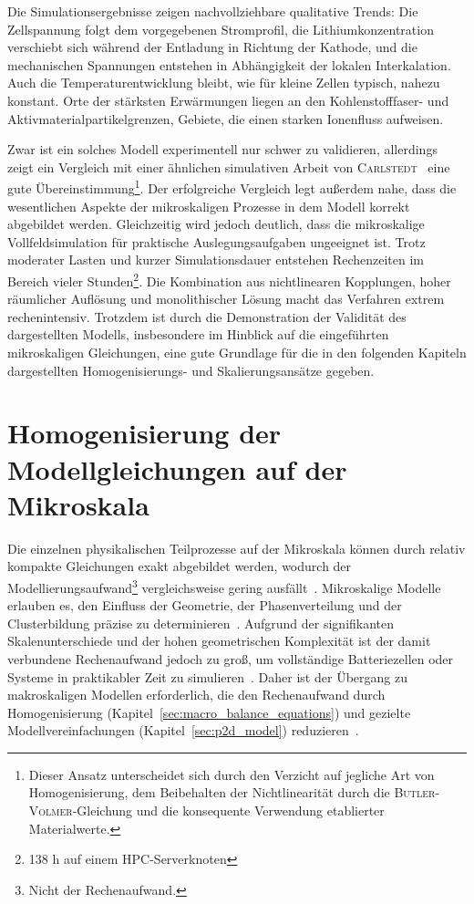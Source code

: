 Die Simulationsergebnisse zeigen nachvollziehbare qualitative Trends: Die Zellspannung folgt dem vorgegebenen Stromprofil, die Lithiumkonzentration verschiebt sich während der Entladung in Richtung der Kathode, und die mechanischen Spannungen entstehen in Abhängigkeit der lokalen Interkalation. Auch die Temperaturentwicklung bleibt, wie für kleine Zellen typisch, nahezu konstant. Orte der stärksten Erwärmungen liegen an den Kohlenstofffaser- und Aktivmaterialpartikelgrenzen, Gebiete, die einen starken Ionenfluss aufweisen.

Zwar ist ein solches Modell experimentell nur schwer zu validieren, allerdings zeigt ein Vergleich mit einer ähnlichen simulativen Arbeit von \textsc{Carlstedt}~\cite{Carlstedt2020b} eine gute Übereinstimmung\footnote{Dieser Ansatz unterscheidet sich durch den Verzicht auf jegliche Art von Homogenisierung, dem Beibehalten der Nichtlinearität durch die \textsc{Butler-Volmer}-Gleichung und die konsequente Verwendung etablierter Materialwerte.}. Der erfolgreiche Vergleich legt außerdem nahe, dass die wesentlichen Aspekte der mikroskaligen Prozesse in dem Modell korrekt abgebildet werden. Gleichzeitig wird jedoch deutlich, dass die mikroskalige Vollfeldsimulation für praktische Auslegungsaufgaben ungeeignet ist. Trotz moderater Lasten und kurzer Simulationsdauer entstehen Rechenzeiten im Bereich vieler Stunden\footnote{138 h auf einem HPC-Serverknoten}. Die Kombination aus nichtlinearen Kopplungen, hoher räumlicher Auflösung und monolithischer Lösung macht das Verfahren extrem rechenintensiv. 
Trotzdem ist durch die Demonstration der Validität des dargestellten Modells, insbesondere im Hinblick auf die eingeführten mikroskaligen Gleichungen, eine gute Grundlage für die in den folgenden Kapiteln dargestellten Homogenisierungs- und Skalierungsansätze gegeben.


\section{\label{sec:homogenisation}Homogenisierung der Modellgleichungen auf der Mikroskala}

Die einzelnen physikalischen Teilprozesse auf der Mikroskala können durch relativ kompakte Gleichungen exakt abgebildet werden, wodurch der Modellierungsaufwand\footnote{Nicht der Rechenaufwand.} vergleichsweise gering ausfällt~\cite{Plett2015}. Mikroskalige Modelle erlauben es, den Einfluss der Geometrie, der Phasenverteilung und der Clusterbildung präzise zu determinieren~\cite{Newman2021}. Aufgrund der signifikanten Skalenunterschiede und der hohen geometrischen Komplexität ist der damit verbundene Rechenaufwand jedoch zu groß, um vollständige Batteriezellen oder Systeme in praktikabler Zeit zu simulieren~\cite{Liu2019}. Daher ist der Übergang zu makroskaligen Modellen erforderlich, die den Rechenaufwand durch Homogenisierung (Kapitel~\ref{sec:macro_balance_equations}) und gezielte Modellvereinfachungen (Kapitel~\ref{sec:p2d_model}) reduzieren~\cite{Plett2015}.

